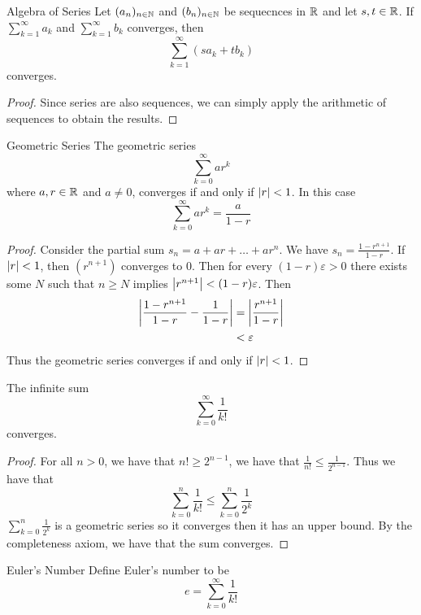 \documentclass[a4paper]{article}
\begin{document}
\begin{thm}{Algebra of Series}{} Let $(a_n)_{n\in\mathbb{N}}$ and $(b_n)_{n\in\mathbb{N}}$ be sequecnces in $\mathbb{R}$ and let $s,t\in\mathbb{R}$. If $\sum_{k=1}^\infty a_k$ and $\sum_{k=1}^\infty b_k$ converges, then $$\sum_{k=1}^\infty(sa_k+tb_k)$$ converges. \tcbline
\begin{proof} Since series are also sequences, we can simply apply the arithmetic of sequences to obtain the results. 
\end{proof}
\end{thm}

\begin{thm}{Geometric Series}{} The geometric series $$\sum_{k=0}^{\infty}ar^k$$ where $a,r\in\mathbb{R}$ and $a\neq0$, converges if and only if $\abs{r}<1$. In this case $$\sum_{k=0}^{\infty}ar^k=\frac{a}{1-r}$$ \tcbline
\begin{proof} Consider the partial sum $s_n=a+ar+\dots+ar^{n}$. We have $s_n=\frac{1-r^{n+1}}{1-r}$. If $\abs{r}<1$, then $(r^{n+1})$ converges to $0$. Then for every $(1-r)\varepsilon>0$ there exists some $N$ such that $n\geq N$ implies $\abs{r^{n+1}}<(1-r)\varepsilon$. Then
\begin{align*}
\abs{\frac{1-r^{n+1}}{1-r}-\frac{1}{1-r}}&=\abs{\frac{r^{n+1}}{1-r}}\\
&<\varepsilon
\end{align*} Thus the geometric series converges if and only if $\abs{r}<1$. 
\end{proof}
\end{thm}

\begin{crl}{}{} The infinite sum $$\sum_{k=0}^{\infty}\frac{1}{k!}$$ converges. \tcbline
\begin{proof}  For all $n>0$, we have that $n!\geq2^{n-1}$, we have that $\frac{1}{n!}\leq\frac{1}{2^{n-1}}$. Thus we have that $$\sum_{k=0}^{n}\frac{1}{k!}\leq\sum_{k=0}^{n}\frac{1}{2^{k}}$$ $\sum_{k=0}^{n}\frac{1}{2^{k}}$ is a geometric series so it converges then it has an upper bound. By the completeness axiom, we have that the sum converges. 
\end{proof}
\end{crl}

\begin{defn}{Euler's Number}{} Define Euler's number to be $$e=\sum_{k=0}^{\infty}\frac{1}{k!}$$
\end{defn}
\end{document}
